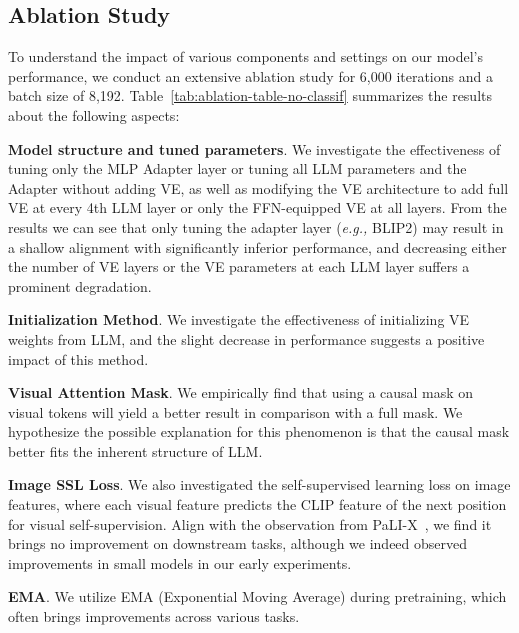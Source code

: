 \subsection{Ablation Study}
To understand the impact of various components and settings on our model's performance, we conduct an extensive ablation study for 6,000 iterations and a batch size of 8,192. Table~\ref{tab:ablation-table-no-classif} summarizes the results about the following aspects:



\textbf{Model structure and tuned parameters}. We investigate the effectiveness of tuning only the MLP Adapter layer or tuning all LLM parameters and the Adapter without adding VE, as well as modifying the VE architecture to add full VE at every 4th LLM layer or only the FFN-equipped VE at all layers.
From the results we can see that only tuning the adapter layer (\emph{e.g.,} BLIP2) may result in a shallow alignment with significantly inferior performance, and decreasing either the number of VE layers or the VE parameters at each LLM layer suffers a prominent degradation.




\textbf{Initialization Method}. We investigate the effectiveness of initializing VE weights from LLM, and the slight decrease in performance suggests a positive impact of this method.

\textbf{Visual Attention Mask}. We empirically find that using a causal mask on visual tokens will yield a better result in comparison with a full mask. We hypothesize the possible explanation for this phenomenon is that the causal mask better fits the inherent structure of LLM.

\textbf{Image SSL Loss}. We also investigated the self-supervised learning loss on image features, where each visual feature predicts the CLIP feature of the next position for visual self-supervision. Align with the observation from PaLI-X~\citep{chen2023pali}, we find it brings no improvement on downstream tasks, although we indeed observed improvements in small models in our early experiments.

\textbf{EMA}.
We utilize EMA (Exponential Moving Average) during pretraining, which often brings improvements across various tasks.
